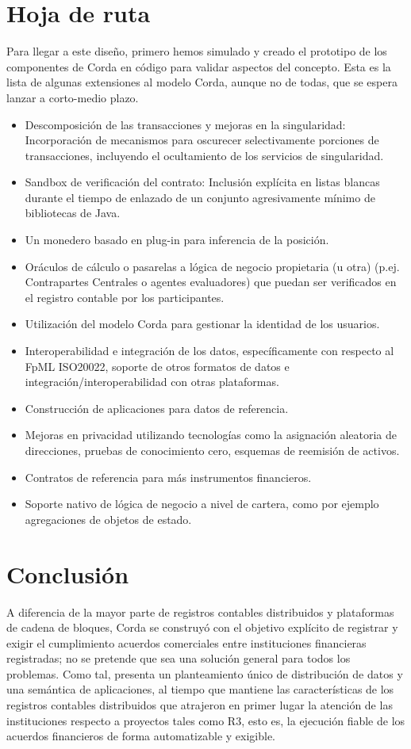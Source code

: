 \documentclass{article}
\begin{document}
\section{Hoja de ruta}
Para llegar a este diseño, primero hemos simulado y creado el prototipo de los componentes de Corda en código para validar aspectos del concepto. Esta es la lista de algunas extensiones al modelo Corda, aunque no de todas, que se espera lanzar a corto-medio plazo.
\begin{itemize}	
\item Descomposición de las transacciones y mejoras en la singularidad: Incorporación de mecanismos para oscurecer selectivamente porciones de transacciones, incluyendo el ocultamiento de los servicios de singularidad.
\item Sandbox de verificación del contrato: Inclusión explícita en listas blancas durante el tiempo de enlazado de un conjunto agresivamente mínimo de bibliotecas de Java.
\item Un monedero basado en plug-in para inferencia de la posición.
\item Oráculos de cálculo o pasarelas a lógica de negocio propietaria (u otra) (p.ej. Contrapartes Centrales o agentes evaluadores) que puedan ser verificados en el registro contable por los participantes.
\item	Utilización del modelo Corda para gestionar la identidad de los usuarios.
\item Interoperabilidad e integración de los datos, específicamente con respecto al FpML ISO20022, soporte de otros formatos de datos e integración/interoperabilidad con otras plataformas.
\item	Construcción de aplicaciones para datos de referencia.
\item	Mejoras en privacidad utilizando tecnologías como la asignación aleatoria de direcciones, pruebas de conocimiento cero, esquemas de reemisión de activos.
\item	Contratos de referencia para más instrumentos financieros.
\item Soporte nativo de lógica de negocio a nivel de cartera, como por ejemplo agregaciones de objetos de estado.
\end{itemize}
\section{Conclusión}
A diferencia de la mayor parte de registros contables distribuidos y plataformas de cadena de bloques, Corda se construyó con el objetivo explícito de registrar y exigir el cumplimiento acuerdos comerciales entre instituciones financieras registradas; no se pretende que sea una solución general para todos los problemas. Como tal, presenta un planteamiento único de distribución de datos y una semántica de aplicaciones, al tiempo que mantiene las características de los registros contables distribuidos que atrajeron en primer lugar la atención de las instituciones respecto a proyectos tales como R3, esto es, la ejecución fiable de los acuerdos financieros de forma automatizable y exigible.


\end{document}
